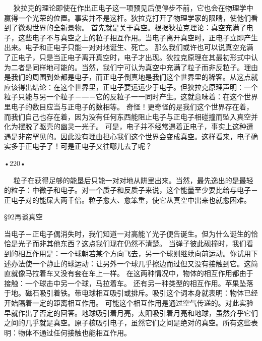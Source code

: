   
狄拉克的理论即使在作出正电子这一项预见后便停步不前，它也会在物理学中赢得一个光荣的位置。事实并不是这杆。狄拉克打开了物理学家的限睛，使他们看到了微观世界的全新景物。
首先就是关于真空。根据狄拉克理论：真空充满了电子，这些电子不与真空之上的粒子相互作用。当电子离开真空时，正电子立即产生出来。电子和正电子只能一对对地诞生、死亡。
那么我们或许也可以说真空充满了正电子，只是当正电子离开真空时，电子才出现。狄拉克原理在其最初形式中认为二者是同样地可能的。当然，我们宁可认为真空中充满了粒子而非反粒子。理由是我们的周围到处都是电子，而正电子倒真地是我们这个世界里的稀客。从这点就应该得出结论：在这个世界里，正电子要远远少于电子。但狄拉克原理声明：一个粒子只能与另一个粒子－—－它的反粒子一一同时产生。这就意味着：在这个世界里电子的数目应当与正电子的数相等。
奇怪！更奇怪的是我们这个世界存在着，而我们自己也存在着，因为没有任何东西能阻止电子与正电子相碰撞而坠入真空并化为摆脱了驱壳的幽灵一光子。
可是，电子并不经常遇着正电子，事实上这种遭遇是非帘罕见的。因此没有理由担心我们这个世界会变成真空。这样看来，电子确实多于正电子了！可是正电子又往哪儿去了呢？

•220•
  










  
粒子在获得足够的能垦后只能一对对地从阱里出来。当然，最先逸出的是最轻的粒子：中微子和电子。对一个质子和反质子来说，这个能量至少耍比给与电子－正电子对的能屎大两千倍。粒子愈大、愈笨重，使它从真空中出来也就愈困难。

§92再谈真空

当电子－正电子偶消失时，我们知道一对高能丫光子便告诞生。但为什么诞生的恰恰是光子而非其他东西？这点我们现在仍然不清楚。
当弹子彼此砚撞时，我们看到的相互作用是：一个球朝若某个方向飞去，另一个球则继续向前运动。你试用下述办法使一个静止的球运动：让另外一个球几乎擦边而过但又没有接触到它。这简直就像马拉着车又没有套在车上一样。
在这两种情况中，物体的相互作用都由于接触：一个球击中另一个球，马拉着车。
还有另一种类型的相互作用。苹果坠落于地。磁石吸引着铁。带电球相互吸引或排斥。吸引这个词本身就表明：物体已经开始隔着一定的距离相互作用。
可能这个相互作用是通过空气传递的。对此实验早就作出了否定的回答。地球吸引着月亮，太阳吸引着月亮和地球，虽然介乎它们之间的几乎就是真空。原子核吸引电子，虽然它们之间是绝对的真空。所有这些表明：物体不通过任何接触也能相互作用。

